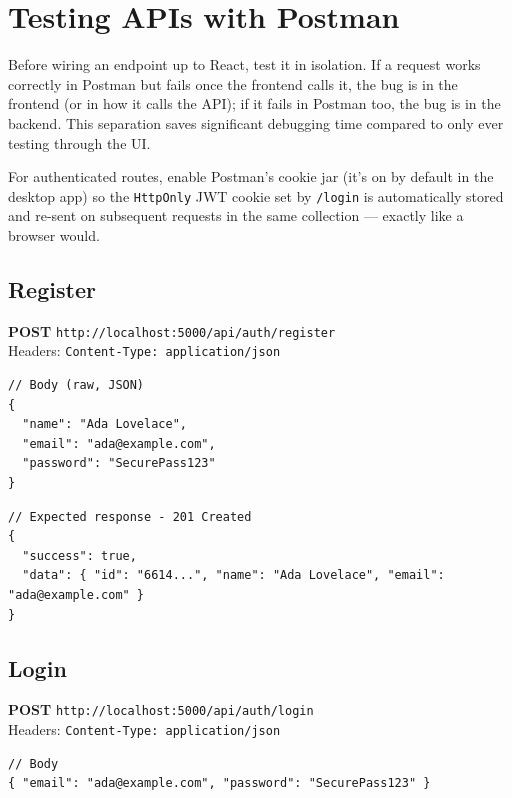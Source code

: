 \chapter{Testing APIs with Postman}

Before wiring an endpoint up to React, test it in isolation. If a request
works correctly in Postman but fails once the frontend calls it, the bug is
in the frontend (or in how it calls the API); if it fails in Postman too,
the bug is in the backend. This separation saves significant debugging time
compared to only ever testing through the UI.

\begin{notebox}[NOTE]
For authenticated routes, enable Postman's cookie jar (it's on by default
in the desktop app) so the \texttt{HttpOnly} JWT cookie set by
\texttt{/login} is automatically stored and re-sent on subsequent requests
in the same collection --- exactly like a browser would.
\end{notebox}

\section{Register}

\textbf{POST} \texttt{http://localhost:5000/api/auth/register}\\
Headers: \texttt{Content-Type: application/json}

\begin{lstlisting}
// Body (raw, JSON)
{
  "name": "Ada Lovelace",
  "email": "ada@example.com",
  "password": "SecurePass123"
}
\end{lstlisting}

\begin{lstlisting}
// Expected response - 201 Created
{
  "success": true,
  "data": { "id": "6614...", "name": "Ada Lovelace", "email": "ada@example.com" }
}
\end{lstlisting}

\section{Login}

\textbf{POST} \texttt{http://localhost:5000/api/auth/login}\\
Headers: \texttt{Content-Type: application/json}

\begin{lstlisting}
// Body
{ "email": "ada@example.com", "password": "SecurePass123" }
\end{lstlisting}

